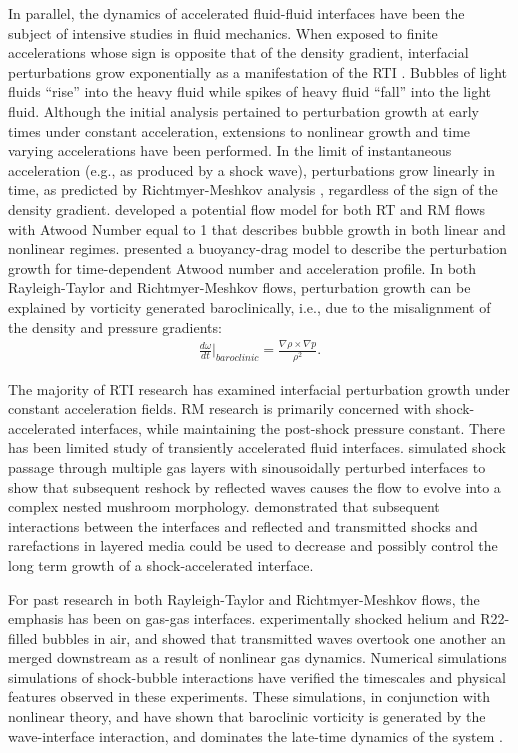 \documentclass{jfm}%
\begin{document}
In parallel, the dynamics of accelerated fluid-fluid interfaces have
been the subject of intensive studies in fluid mechanics. When exposed
to finite accelerations whose sign is opposite that of the density
gradient, interfacial perturbations grow exponentially as a
manifestation of the \ac{RTI} \citep{Taylor1950}. Bubbles of light
fluids ``rise'' into the heavy fluid while spikes of heavy fluid
``fall'' into the light fluid. Although the initial analysis pertained
to perturbation growth at early times under constant acceleration,
extensions to nonlinear growth and time varying accelerations have
been performed. In the limit of instantaneous acceleration (e.g., as
produced by a shock wave), perturbations grow linearly in time, as
predicted by Richtmyer-Meshkov analysis \citep{Richtmyer1960,
  Meshkov1969}, regardless of the sign of the density
gradient. \cite{Hecht1994} developed a potential flow model for both
RT and RM flows with Atwood Number equal to 1 that describes bubble
growth in both linear and nonlinear regimes. \cite{Srebro2003}
presented a buoyancy-drag model to describe the perturbation growth
for time-dependent Atwood number and acceleration profile. In both
Rayleigh-Taylor and Richtmyer-Meshkov flows, perturbation growth can
be explained by vorticity generated baroclinically, i.e., due to the
misalignment of the density and pressure gradients:
\begin{align}
  \label{eq:baroclinic_equation}
  \frac{d\omega}{dt} \biggr\rvert_{baroclinic} = \frac{\nabla \rho \times \nabla p}{\rho^2}.%
\end{align}

The majority of RTI research has examined interfacial perturbation
growth under constant acceleration fields. RM research is primarily
concerned with shock-accelerated interfaces, while maintaining the
post-shock pressure constant. There has been limited study of
transiently accelerated fluid interfaces. \cite{Mikaelian1996}
simulated shock passage through multiple gas layers with sinousoidally
perturbed interfaces to show that subsequent reshock by reflected
waves causes the flow to evolve into a complex nested mushroom
morphology. \cite{HenrydeFrahan2015b} demonstrated that subsequent
interactions between the interfaces and reflected and transmitted
shocks and rarefactions in layered media could be used to decrease and
possibly control the long term growth of a shock-accelerated
interface.

For past research in both Rayleigh-Taylor and Richtmyer-Meshkov flows,
the emphasis has been on gas-gas interfaces. \cite{Haas1987}
experimentally shocked helium and R22-filled bubbles in air, and
showed that transmitted waves overtook one another an merged
downstream as a result of nonlinear gas dynamics. Numerical
simulations simulations of shock-bubble interactions have verified the
timescales and physical features observed in these experiments. These
simulations, in conjunction with nonlinear theory, and have shown that
baroclinic vorticity is generated by the wave-interface interaction,
and dominates the late-time dynamics of the system
\citep{Picone1988,Quirk1996}.
\end{document}
